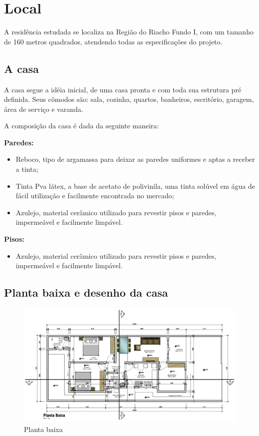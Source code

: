 \section{Local}
A residência estudada se localiza na Região do Riacho Fundo I, com um tamanho de 160 metros quadrados, atendendo todas as especificações do projeto.

\subsection{A casa}
\par A casa segue a idéia inicial, de uma casa pronta e com toda sua estrutura pré definida. Seus cômodos são: sala, cozinha, quartos, banheiros, escritório, garagem, área de serviço e varanda.
\par A composição da casa é dada da seguinte maneira:
\par \textbf{Paredes:}
    \begin{itemize}
        \item Reboco, tipo de argamassa para deixar as paredes uniformes e aptas a receber a tinta;
        \item Tinta Pva látex, a base de acetato de polivinila, uma tinta solúvel em água de fácil utilização e facilmente encontrada no mercado;
        \item Azulejo, material cerâmico utilizado para revestir pisos e paredes, impermeável e facilmente limpável.
    \end{itemize}
\par \textbf{Pisos:}
    \begin{itemize}
        \item Azulejo, material cerâmico utilizado para revestir pisos e paredes, impermeável e facilmente limpável.
    \end{itemize}
\subsection{Planta baixa e desenho da casa}

\FloatBarrier

\begin{figure}[!ht]
\caption{Planta baixa}
\includegraphics[width=\textwidth]{figuras/planta}
\end{figure}

